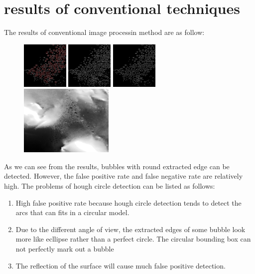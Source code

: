 \documentclass[11pt]{elegantpaper}
\begin{document}
\section{results of conventional techniques}
The results of conventional image processin method are as follow:
\begin{figure}[htbp]
	\centering
    \includegraphics[width=0.2\textwidth]{../results_edge.jpg}
    \includegraphics[width=0.2\textwidth]{../edge_0.jpg}
    \includegraphics[width=0.2\textwidth]{../edge_1.jpg}
    \includegraphics[width=0.4\textwidth]{../results_all.jpg}
\end{figure}

As we can see from the results, bubbles with round extracted edge can be detected. However, the false 
positive rate and false negative rate are relatively high. The problems of hough circle detection can be listed as follows:
\begin{enumerate}
	\item High false positive rate because hough circle detection tends to detect the arcs that can fits in a circular model.
	\item Due to the different angle of view, the extracted edges of some bubble look more like ecllipse rather than a perfect circle.
	The circular bounding box can not perfectly mark out a bubble
	\item The reflection of the surface will cause much false positive detection.
\end{enumerate}
\end{document}
